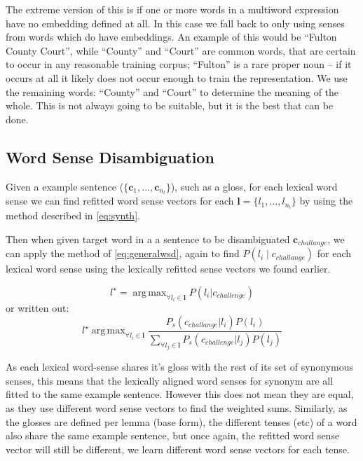 \documentclass{sig-alternate}
\renewcommand{\c}{\mathbf{c}}
\renewcommand{\l}{\mathbf{l}}
\DeclareMathOperator*{\argmax}{arg\,max}
\begin{document}
The extreme version of this is if one or more words in a multiword expression have no embedding defined at all. In this case we fall back to only using senses from words which do have embeddings. An example of this would be ``Fulton County Court'', while ``County'' and ``Court'' are common words, that are certain to occur in any reasonable training corpus; ``Fulton'' is a rare proper noun -- if it occurs at all it likely does not occur enough to train the representation. We use the remaining words: ``County'' and ``Court'' to determine the meaning of the whole. This is not always going to be suitable, but it is the best that can be done.


\subsection{Word Sense Disambiguation} \label{lexicalWSD}
Given a example sentence ($\{\c_1,...,\c_{n_l}\}$), such as a gloss, for each lexical word sense we can find refitted word sense vectors for each $\l=\{l_1,..., l_{n_l}\}$ by using the method described in \cref{eq:synth}. 

Then when given target word in a a sentence to be disambiguated $\c_{challange}$, we can apply the method of \cref{eq:generalwsd}, again to find $P(l_i \mid c_{challange})$ for each lexical word sense using the lexically refitted sense vectors we found earlier.

\begin{equation}\label{eq:lexicalwsd}
l^\star = \argmax_{\forall l_i \in \l} P(l_i|c_{challenge})
\end{equation}
or written out:
\begin{equation}\label{eq:lexicalwsdexpanded}
l^\star \argmax_{\forall l_i \in \l} \frac{P_s(c_{challange}|l_i)P(l_i)}{\sum_{\forall l_j \in \l} P_s(c_{challenge}|l_j)P(l_j)}
\end{equation}

As each lexical word-sense shares it's gloss with the rest of its set of synonymous senses, this means that the lexically aligned word senses for synonym are all fitted to the same example sentence. However this does not mean they are equal, as they use different word sense vectors to find the weighted sums. Similarly, as the glosses are defined per lemma (base form), the different tenses (etc) of a word also share the same example sentence, but once again, the refitted word sense vector will still be different, we learn different word sense vectors for each tense.
\end{document}
